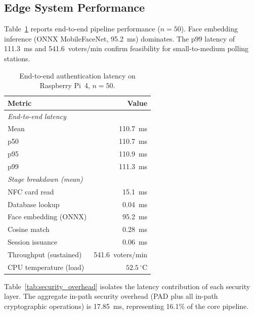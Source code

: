 \documentclass[submission]{sacjsub}
\begin{document}
\subsection{Edge System Performance}

Table~\ref{tab:pi} reports end-to-end pipeline performance
(\(n{=}50\)). Face embedding inference (ONNX MobileFaceNet, 95.2~ms)
dominates. The p99 latency of 111.3~ms and 541.6~voters/min confirm
feasibility for small-to-medium polling stations.

\begin{table}[t]
\caption{End-to-end authentication latency on Raspberry Pi~4, \(n{=}50\).}
\label{tab:pi}
\begin{tabular}{|l|r|}
  \hline
  Metric & Value \\
  \hline
  \multicolumn{2}{|l|}{\textit{End-to-end latency}} \\
  \quad Mean & 110.7~ms \\
  \quad p50  & 110.7~ms \\
  \quad p95  & 110.9~ms \\
  \quad p99  & 111.3~ms \\
  \hline
  \multicolumn{2}{|l|}{\textit{Stage breakdown (mean)}} \\
  \quad NFC card read         & 15.1~ms \\
  \quad Database lookup       & 0.04~ms \\
  \quad Face embedding (ONNX) & 95.2~ms \\
  \quad Cosine match          & 0.28~ms \\
  \quad Session issuance      & 0.06~ms \\
  \hline
  Throughput (sustained) & 541.6~voters/min \\
  CPU temperature (load) & \(52.5\,^\circ\)C \\
  \hline
\end{tabular}
\end{table}

Table~\ref{tab:security_overhead} isolates the latency contribution
of each security layer. The aggregate in-path security overhead
(PAD plus all in-path cryptographic operations) is 17.85~ms,
representing 16.1\% of the core pipeline.
\end{document}
